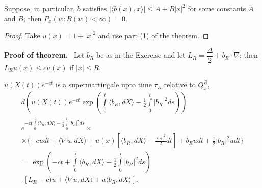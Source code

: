 \begin{coro*}
Suppose, in particular, $b$ satisfies $|\langle b(x),x\rangle|\leq
A+B|x|^{2}$ for some constants $A$ and $B$; then $P_{x}(w:B(w)<\infty)=0$.
\end{coro*}

\begin{proof}
Take $u(x)=1+|x|^{2}$ and use part (1) of the theorem.
\end{proof}

\noindent
{\bf Proof of theorem.}~ Let $b_{R}$ be as in the Exercise and let
$L_{R}=\dfrac{\Delta}{2}+b_{R}\cdot \nabla$; then $L_{R}u(x)\leq
cu(x)$ if $|x|\leq R$.

\begin{claim*}
$u(X(t))e^{-ct}$ is a supermartingale upto time $\tau_{R}$ relative to
  $Q^{R}_{x}$, 
\begin{gather*}
d\left(u(X(t))e^{-ct}\exp\left(\int\limits^{t}_{0}\langle
b_{R},dX\rangle
-\frac{1}{2}\int\limits^{t}_{0}|b_{R}|^{2}ds\right)\right)\\
e^{-ct\int\limits^{t}_{0}\langle b_{R},dX\rangle
-\frac{1}{2}\int\limits^{t}_{0}|b_{R}|^{2}ds}\times\\
\times\{-cudt+\langle \nabla u, dX\rangle +u(x)[\langle b_{R},dX\rangle
  -\frac{|b_{R}|^{2}}{2}dt]+b_{R}udt+\frac{1}{2}|b_{R}|^{2}udt\}\\
=\exp (-ct+\int\limits^{t}_{0}\langle b_{R},dX\rangle
-\frac{1}{2}\int\limits^{t}_{0}|b_{R}|^{2}ds)\\
\cdot [L_{R}-c)u+\langle
  \nabla u, dX\rangle +u\langle b_{R},dX\rangle].
\end{gather*}\pageoriginale


\end{claim*}
